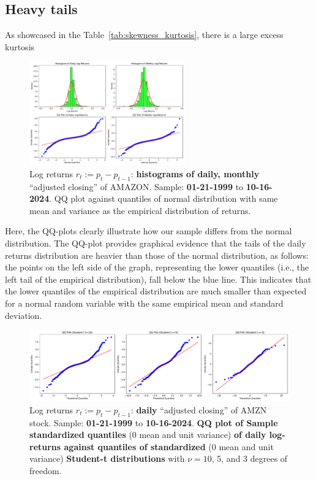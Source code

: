 \documentclass{article}
\begin{document}
\subsection{Heavy tails}
\noindent As showcased in the Table~\ref{tab:skewness_kurtosis}, there is a large excess kurtosis

\begin{figure}[H]
    \centering
    \includegraphics[width=0.6\textwidth]{Img/QQplot_daily_weekly_AMZN.pdf}
    \caption{Log returns $r_t := p_t - p_{t-1}$: \textbf{histograms of daily, monthly} “adjusted closing” of AMAZON. 
    Sample: \textbf{01-21-1999} to \textbf{10-16-2024}. QQ plot against quantiles of normal distribution with same mean and variance as the empirical distribution of returns.}
    \label{fig:Hstogram_QQ_plot}
\end{figure}

\noindent Here, the QQ-plots clearly illustrate how our sample differs from the normal distribution. 
The QQ-plot provides graphical evidence that the tails of the daily returns distribution are heavier than those of the normal distribution, as follows: 
the points on the left side of the graph, representing the lower quantiles (i.e., the left tail of the empirical distribution), 
fall below the blue line. This indicates that the lower quantiles of the empirical distribution are much smaller than expected for a normal random variable with the same empirical mean and standard deviation. 

\begin{figure}[H]
    \centering
    \includegraphics[width=1\textwidth]{Img/qqplt_tstudents_AMZNdaily.pdf}
    \caption{Log returns $r_t := p_t - p_{t-1}$: \textbf{daily} “adjusted closing” of AMZN stock. 
    Sample: \textbf{01-21-1999} to \textbf{10-16-2024}. \textbf{QQ plot of Sample standardized quantiles} (0 mean and unit variance) \textbf{of daily log-returns against quantiles of standardized} (0 mean and unit variance) \textbf{Student-t distributions} with $\nu = 10$, 5, and 3 degrees of freedom.}
    \label{fig:Hstogram_QQ_plot_T_student}
\end{figure}
\end{document}
